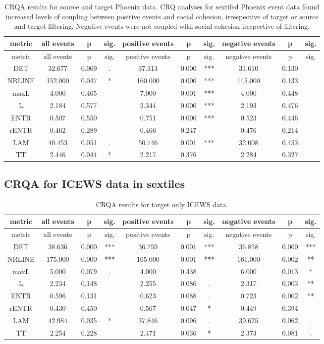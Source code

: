 \documentclass[english,man]{apa6}
\begin{document}
\begin{longtable}[]{@{}cccccccccc@{}}
\caption{CRQA results for source and target Phoenix data.
CRQ analyses for sextiled Phoenix event data found increased levels of coupling between positive events and social cohesion, irrespective of target or source and target filtering. Negative events were not coupled with social cohesion irrepective of filtering.}\tabularnewline
\toprule
metric & all events & p & sig. & positive events & p & sig. & negative events & p & sig.\tabularnewline
\midrule
\endfirsthead
\toprule
metric & all events & p & sig. & positive events & p & sig. & negative events & p & sig.\tabularnewline
\midrule
\endhead
DET & 32.677 & 0.069 & . & 37.313 & 0.000 & *** & 31.610 & 0.130 &\tabularnewline
NRLINE & 152.000 & 0.047 & * & 160.000 & 0.000 & *** & 145.000 & 0.133 &\tabularnewline
maxL & 4.000 & 0.465 & & 7.000 & 0.001 & *** & 4.000 & 0.448 &\tabularnewline
L & 2.184 & 0.577 & & 2.344 & 0.000 & *** & 2.193 & 0.476 &\tabularnewline
ENTR & 0.507 & 0.550 & & 0.751 & 0.000 & *** & 0.523 & 0.446 &\tabularnewline
rENTR & 0.462 & 0.289 & & 0.466 & 0.247 & & 0.476 & 0.214 &\tabularnewline
LAM & 40.453 & 0.051 & . & 50.746 & 0.001 & *** & 32.008 & 0.453 &\tabularnewline
TT & 2.446 & 0.044 & * & 2.217 & 0.376 & & 2.284 & 0.327 &\tabularnewline
\bottomrule
\end{longtable}

\hypertarget{crqa-for-icews-data-in-sextiles}{%
\subsection{CRQA for ICEWS data in sextiles}\label{crqa-for-icews-data-in-sextiles}}

\begin{longtable}[]{@{}cccccccccc@{}}
\caption{CRQA results for target only ICEWS data.}\tabularnewline
\toprule
metric & all events & p & sig. & positive events & p & sig. & negative events & p & sig.\tabularnewline
\midrule
\endfirsthead
\toprule
metric & all events & p & sig. & positive events & p & sig. & negative events & p & sig.\tabularnewline
\midrule
\endhead
DET & 38.636 & 0.000 & *** & 36.759 & 0.001 & *** & 36.858 & 0.000 & ***\tabularnewline
NRLINE & 175.000 & 0.000 & *** & 165.000 & 0.001 & *** & 161.000 & 0.002 & **\tabularnewline
maxL & 5.000 & 0.079 & . & 4.000 & 0.438 & & 6.000 & 0.013 & *\tabularnewline
L & 2.234 & 0.148 & & 2.255 & 0.086 & . & 2.317 & 0.003 & **\tabularnewline
ENTR & 0.596 & 0.131 & & 0.623 & 0.088 & . & 0.723 & 0.002 & **\tabularnewline
rENTR & 0.430 & 0.450 & & 0.567 & 0.047 & * & 0.449 & 0.394 &\tabularnewline
LAM & 42.984 & 0.035 & * & 37.846 & 0.096 & . & 39.625 & 0.062 & .\tabularnewline
TT & 2.254 & 0.228 & & 2.471 & 0.036 & * & 2.373 & 0.081 & .\tabularnewline
\bottomrule
\end{longtable}
\end{document}
